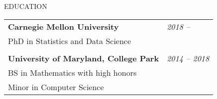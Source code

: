 \documentclass{resume} %
\begin{document}

\begin{rSection}{EDUCATION}

\begin{tabular}{p{14cm}R{2.5cm}}
	\bf{Carnegie Mellon University}  &  \it{2018 -- }  \\ 
	PhD in Statistics and Data Science &  \\ & \\
	\textbf{University of Maryland, College Park} & \it{2014 -- 2018}
	 \\  BS in Mathematics with high honors & \\
	 Minor in Computer Science
\end{tabular} 
\end{rSection}





\end{document}
